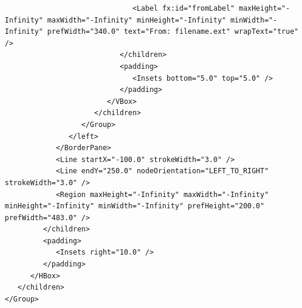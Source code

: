 \begin{lstlisting}
                              <Label fx:id="fromLabel" maxHeight="-Infinity" maxWidth="-Infinity" minHeight="-Infinity" minWidth="-Infinity" prefWidth="340.0" text="From: filename.ext" wrapText="true" />
                           </children>
                           <padding>
                              <Insets bottom="5.0" top="5.0" />
                           </padding>
                        </VBox>
                     </children>
                  </Group>
               </left>
            </BorderPane>
            <Line startX="-100.0" strokeWidth="3.0" />
            <Line endY="250.0" nodeOrientation="LEFT_TO_RIGHT" strokeWidth="3.0" />
            <Region maxHeight="-Infinity" maxWidth="-Infinity" minHeight="-Infinity" minWidth="-Infinity" prefHeight="200.0" prefWidth="483.0" />
         </children>
         <padding>
            <Insets right="10.0" />
         </padding>
      </HBox>
   </children>
</Group>
\end{lstlisting}
